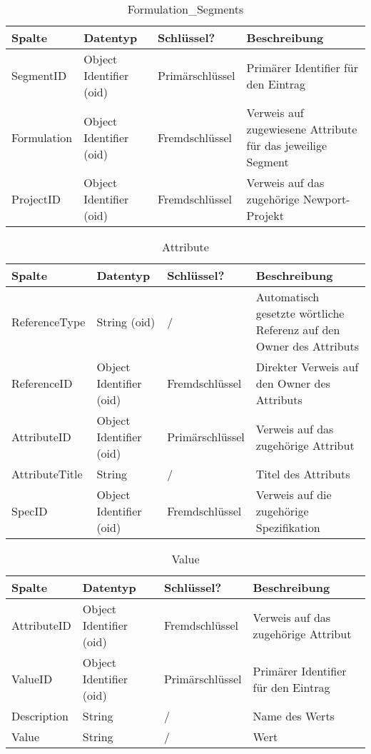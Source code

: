 \begin{table}[hbt]
    \centering
    \caption{Formulation\_Segments}
    \begin{tabularx}{\textwidth}{l l l X}
        \toprule
        \textbf{Spalte} & \textbf{Datentyp} & \textbf{Schlüssel?} & \textbf{Beschreibung} \\
        \midrule
        SegmentID & Object Identifier (oid) & Primärschlüssel & Primärer Identifier für den Eintrag\\
        Formulation & Object Identifier (oid) & Fremdschlüssel & Verweis auf zugewiesene Attribute für das jeweilige Segment\\
        ProjectID & Object Identifier (oid) & Fremdschlüssel & Verweis auf das zugehörige Newport-Projekt\\
        \bottomrule
    \end{tabularx}
    \label{tab:formulation}
\end{table}

\begin{table}[hbt]
    \centering
    \caption{Attribute}
    \begin{tabularx}{\textwidth}{l l l X}
        \toprule
        \textbf{Spalte} & \textbf{Datentyp} & \textbf{Schlüssel?} & \textbf{Beschreibung} \\
        \midrule
        ReferenceType & String (oid) & / & Automatisch gesetzte wörtliche Referenz auf den Owner des Attributs\\
        ReferenceID & Object Identifier (oid) & Fremdschlüssel & Direkter Verweis auf den Owner des Attributs\\
        AttributeID & Object Identifier (oid) & Primärschlüssel & Verweis auf das zugehörige Attribut\\
        AttributeTitle & String & / & Titel des Attributs\\
        SpecID & Object Identifier (oid) & Fremdschlüssel & Verweis auf die zugehörige Spezifikation\\
        \bottomrule
    \end{tabularx}
    \label{tab:formulation}
\end{table}

\begin{table}[hbt]
    \centering
    \caption{Value}
    \begin{tabularx}{\textwidth}{l l l X}
        \toprule
        \textbf{Spalte} & \textbf{Datentyp} & \textbf{Schlüssel?} & \textbf{Beschreibung} \\
        \midrule
        AttributeID & Object Identifier (oid) & Fremdschlüssel & Verweis auf das zugehörige Attribut\\
        ValueID & Object Identifier (oid) & Primärschlüssel & Primärer Identifier für den Eintrag\\
        Description & String & / & Name des Werts\\
        Value & String & / & Wert\\
        \bottomrule
    \end{tabularx}
    \label{tab:formulation}
\end{table}

